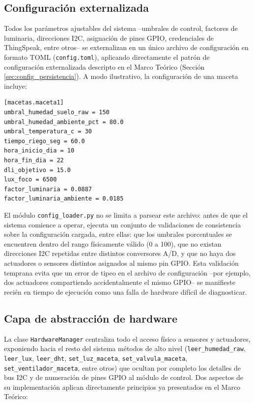 \subsection{Configuración externalizada}
\label{subsec:config_externalizada_real}

Todos los parámetros ajustables del sistema --umbrales de control, factores de luminaria, direcciones I2C, asignación de pines GPIO, credenciales de ThingSpeak, entre otros-- se externalizan en un único archivo de configuración en formato TOML (\texttt{config.toml}), aplicando directamente el patrón de configuración externalizada descripto en el Marco Teórico (Sección \ref{sec:config_persistencia}). A modo ilustrativo, la configuración de una maceta incluye:

\begin{verbatim}
[macetas.maceta1]
umbral_humedad_suelo_raw = 150
umbral_humedad_ambiente_pct = 80.0
umbral_temperatura_c = 30
tiempo_riego_seg = 60.0
hora_inicio_dia = 10
hora_fin_dia = 22
dli_objetivo = 15.0
lux_foco = 6500
factor_luminaria = 0.0887
factor_luminaria_ambiente = 0.0185
\end{verbatim}

El módulo \texttt{config\_loader.py} no se limita a parsear este archivo: antes de que el sistema comience a operar, ejecuta un conjunto de validaciones de consistencia sobre la configuración cargada, entre ellas: que los umbrales porcentuales se encuentren dentro del rango físicamente válido (0 a 100), que no existan direcciones I2C repetidas entre distintos conversores A/D, y que no haya dos actuadores o sensores distintos asignados al mismo pin GPIO. Esta validación temprana evita que un error de tipeo en el archivo de configuración --por ejemplo, dos actuadores compartiendo accidentalmente el mismo GPIO-- se manifieste recién en tiempo de ejecución como una falla de hardware difícil de diagnosticar.

\subsection{Capa de abstracción de hardware}
\label{subsec:capa_hardware_real}

La clase \texttt{HardwareManager} centraliza todo el acceso físico a sensores y actuadores, exponiendo hacia el resto del sistema métodos de alto nivel (\texttt{leer\_humedad\_raw}, \texttt{leer\_lux}, \texttt{leer\_dht}, \texttt{set\_luz\_maceta}, \texttt{set\_valvula\_maceta}, \texttt{set\_ventilador\_maceta}, entre otros) que ocultan por completo los detalles de bus I2C y de numeración de pines GPIO al módulo de control. Dos aspectos de su implementación aplican directamente principios ya presentados en el Marco Teórico:

